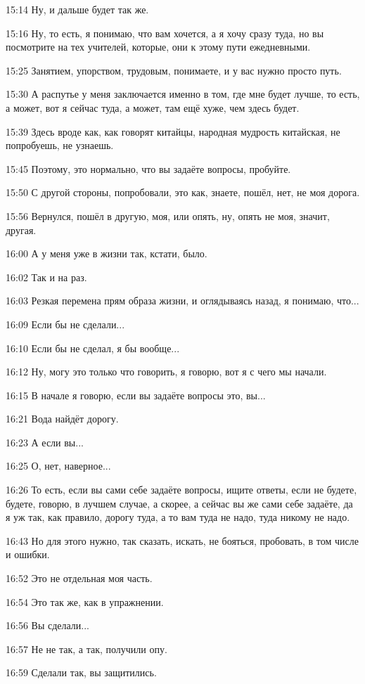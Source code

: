 15:14
Ну, и дальше будет так же.

15:16
Ну, то есть, я понимаю, что вам хочется, а я хочу сразу туда, но вы посмотрите на тех учителей, которые, они к этому пути ежедневными.

15:25
Занятием, упорством, трудовым, понимаете, и у вас нужно просто путь.

15:30
А распутье у меня заключается именно в том, где мне будет лучше, то есть, а может, вот я сейчас туда, а может, там ещё хуже, чем здесь будет.

15:39
Здесь вроде как, как говорят китайцы, народная мудрость китайская, не попробуешь, не узнаешь.

15:45
Поэтому, это нормально, что вы задаёте вопросы, пробуйте.

15:50
С другой стороны, попробовали, это как, знаете, пошёл, нет, не моя дорога.

15:56
Вернулся, пошёл в другую, моя, или опять, ну, опять не моя, значит, другая.

16:00
А у меня уже в жизни так, кстати, было.

16:02
Так и на раз.

16:03
Резкая перемена прям образа жизни, и оглядываясь назад, я понимаю, что...

16:09
Если бы не сделали...

16:10
Если бы не сделал, я бы вообще...

16:12
Ну, могу это только что говорить, я говорю, вот я с чего мы начали.

16:15
В начале я говорю, если вы задаёте вопросы это, вы...

16:21
Вода найдёт дорогу.

16:23
А если вы...

16:25
О, нет, наверное...

16:26
То есть, если вы сами себе задаёте вопросы, ищите ответы, если не будете, будете, говорю, в лучшем случае, а скорее, а сейчас вы же сами себе задаёте, да я уж так, как правило, дорогу туда, а то вам туда не надо, туда никому не надо.

16:43
Но для этого нужно, так сказать, искать, не бояться, пробовать, в том числе и ошибки.

16:52
Это не отдельная моя часть.

16:54
Это так же, как в упражнении.

16:56
Вы сделали...

16:57
Не не так, а так, получили опу.

16:59
Сделали так, вы защитились.

